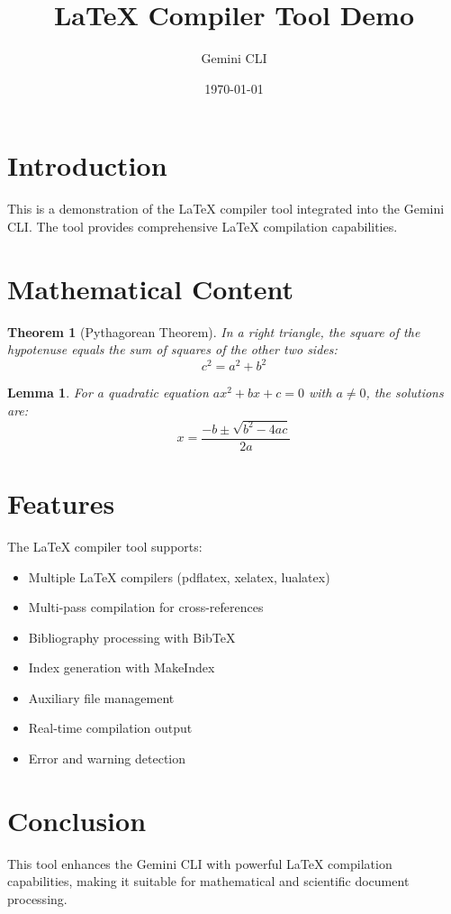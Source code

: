 \documentclass{article}
\title{LaTeX Compiler Tool Demo}
\author{Gemini CLI}
\date{\today}
\newtheorem{theorem}{Theorem}
\newtheorem{lemma}{Lemma}
\begin{document}
\maketitle

\section{Introduction}

This is a demonstration of the LaTeX compiler tool integrated into the Gemini CLI. The tool provides comprehensive LaTeX compilation capabilities.

\section{Mathematical Content}

\begin{theorem}[Pythagorean Theorem]
\label{thm:pythagoras}
In a right triangle, the square of the hypotenuse equals the sum of squares of the other two sides:
\begin{equation}
c^2 = a^2 + b^2
\end{equation}
\end{theorem}

\begin{lemma}
\label{lem:quadratic}
For a quadratic equation $ax^2 + bx + c = 0$ with $a \neq 0$, the solutions are:
\begin{equation}
x = \frac{-b \pm \sqrt{b^2 - 4ac}}{2a}
\end{equation}
\end{lemma}

\section{Features}

The LaTeX compiler tool supports:

\begin{itemize}
\item Multiple LaTeX compilers (pdflatex, xelatex, lualatex)
\item Multi-pass compilation for cross-references
\item Bibliography processing with BibTeX
\item Index generation with MakeIndex
\item Auxiliary file management
\item Real-time compilation output
\item Error and warning detection
\end{itemize}

\section{Conclusion}

This tool enhances the Gemini CLI with powerful LaTeX compilation capabilities, making it suitable for mathematical and scientific document processing.
\end{document}
